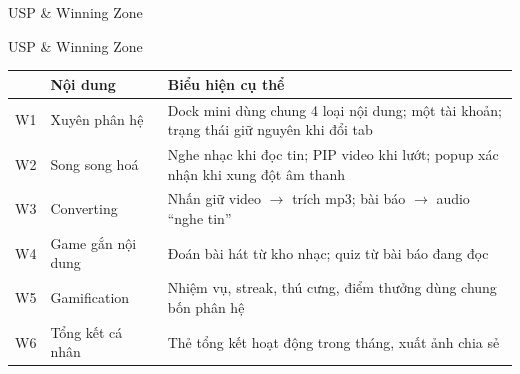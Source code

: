 \begin{frame}{USP \& Winning Zone}
\begin{center}
\end{center}
\vfill
\end{frame}

\begin{frame}{USP \& Winning Zone}
\small
\centering
\begin{tabular}{@{}p{0.5cm}p{3.4cm}p{8.4cm}@{}}
\toprule
 & \textbf{Nội dung} & \textbf{Biểu hiện cụ thể} \\
\midrule
W1 & Xuyên phân hệ & Dock mini dùng chung 4 loại nội dung; một tài khoản; trạng thái giữ nguyên khi đổi tab \\
W2 & Song song hoá & Nghe nhạc khi đọc tin; PIP video khi lướt; popup xác nhận khi xung đột âm thanh \\
W3 & Converting & Nhấn giữ video $\rightarrow$ trích mp3; bài báo $\rightarrow$ audio ``nghe tin'' \\
W4 & Game gắn nội dung & Đoán bài hát từ kho nhạc; quiz từ bài báo đang đọc \\
W5 & Gamification & Nhiệm vụ, streak, thú cưng, điểm thưởng dùng chung bốn phân hệ \\
W6 & Tổng kết cá nhân & Thẻ tổng kết hoạt động trong tháng, xuất ảnh chia sẻ \\
\bottomrule
\end{tabular}
\end{frame}

